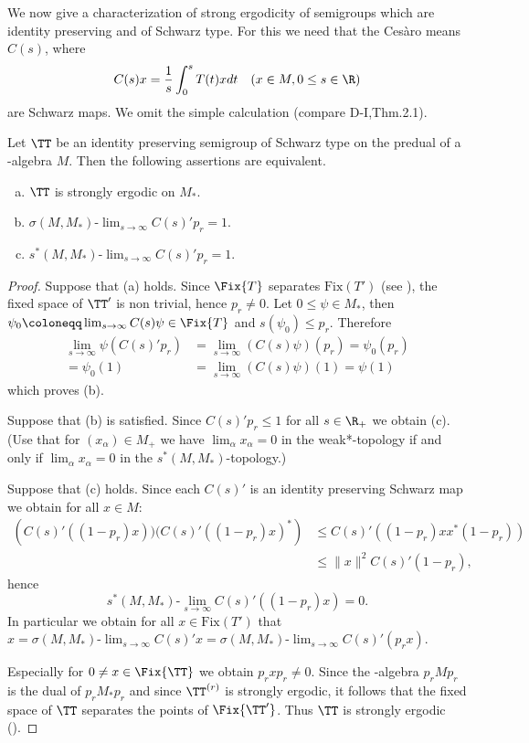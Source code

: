 We now give a characterization of strong ergodicity of semigroups which are identity preserving and of Schwarz type.
For this we need that the Cesàro means $C(s)$, where
\[
C(s)x = \frac{1}{s}\int_{0}^{s} T(t)xdt \quad (x \in M, 0 \leq s \in \R)
\]
are Schwarz maps.
We omit the simple calculation (compare D-I,Thm.2.1).
\begin{proposition}\label{prop:d4-3.3}
Let $\TT$ be an identity preserving semigroup of Schwarz type on the predual of a \WA-algebra $M$.
Then the following assertions are equivalent.
\begin{enumerate}[(a)]
\item
$\TT$ is strongly ergodic on $M_{*}$.

\item
$\sigma(M,M_{*})\text{-}\lim_{s \to \infty} C(s)'p_{r} = 1$.

\item
$s^{*}(M,M_{*})\text{-}\lim_{s \to \infty} C(s)'p_{r} = 1$.
\end{enumerate}
\end{proposition}
\begin{proof}
Suppose that (a) holds.
Since $\Fix{T}$ separates $\text{Fix}(T')$ (see \citet[Chap.2,Thm.1.4]{krengel:1985}), the fixed space of $\TT'$ is non trivial, hence $p_{r} \neq 0$.
Let $0 \leq \psi \in M_{*}$, then $\psi_{0} \coloneqq \lim_{s \to \infty} C(s)\psi \in \Fix{T}$ and $s(\psi_{0}) \leq p_{r}$.
%
Therefore
\begin{align*}
\lim_{s \to \infty} \psi(C(s)'p_{r}) &= \lim_{s \to \infty} (C(s)\psi)(p_{r})  = \psi_{0}(p_{r})  \\
= \psi_{0}(1) &= \lim_{s \to \infty} (C(s)\psi)(1) = \psi(1)
\end{align*}
which proves (b).

Suppose that (b) is satisfied.
Since $C(s)'p_{r} \leq 1$ for all $s \in \R_{+}$ we obtain (c).
(Use that for $(x_{\alpha}) \in M_{+}$ we have $\lim_{\alpha}x_{\alpha} = 0$ in the weak*-topology if and only if $\lim_{\alpha}x_{\alpha} = 0$ in the $s^{*}(M,M_{*})$-topology.)

Suppose that (c) holds.
Since each $C(s)'$ is an identity preserving Schwarz map we obtain for all $x \in M$:
\begin{align*}
	\left( C(s)'((1-p_{r})x))(C(s)'((1-p_{r})x)^{*} \right) 
			&\leq C(s)'((1-p_{r})xx^{*}(1-p_{r}))  \\
 	&\leq \|x\|^2 C(s)'(1-p_{r}),
\end{align*}
hence
\[
s^{*}(M,M_{*})\text{-}\lim_{s \to \infty} C(s)'((1-p_{r})x) = 0.
\]
In particular we obtain for all $x \in \text{Fix}(T')$ that $x = \sigma(M,M_{*})\text{-}\lim_{s \to \infty} C(s)'x = \sigma(M,M_{*})\text{-}\lim_{s \to \infty} C(s)'(p_{r}x)$.

Especially for $0 \neq x \in \Fix{\TT}$ we obtain $p_{r}xp_{r} \neq 0$.
Since the \WA-algebra $p_{r}Mp_{r}$ is the dual of $p_{r}M_{*}p_{r}$ and since $\TT^{(r)}$ is strongly ergodic, it follows that the fixed space of\/ $\TT$ separates the points of $\Fix{\TT'}$.
Thus $\TT$ is strongly ergodic (\citet[Chap. 2, Thm. 1.4]{krengel:1985}).
\end{proof}
